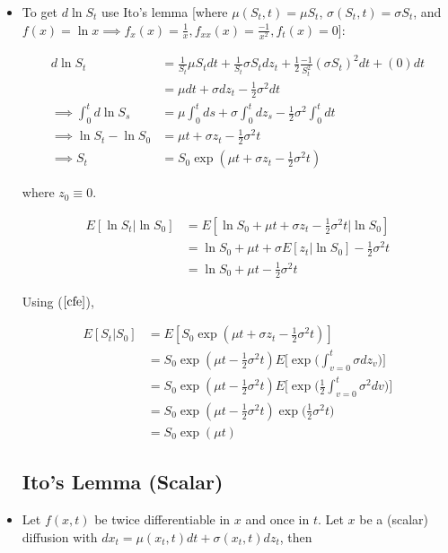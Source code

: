 \documentclass{article}
\begin{document}
\begin{itemize}
\item To get $d \ln S_t$ use Ito's lemma [where $\mu(S_t, t) = \mu S_t$, $\sigma(S_t, t) = \sigma S_t$, and $f(x) = \ln x \implies f_x(x) = \frac{1}{x}, f_{xx}(x) = \frac{-1}{x^2}, f_t(x) = 0$]:

\begin{align*}
d \ln S_t 
&= \frac{1}{S_t} \mu S_t dt  + \frac{1}{S_t} \sigma S_t dz_t + \frac{1}{2} \frac{-1}{S_t^2} (\sigma S_t)^2 dt + (0) dt \\
&= \mu dt + \sigma dz_t - \frac{1}{2} \sigma^2 dt \\
\implies 
\int_0^t d \ln S_s
&= \mu \int_0^t  ds + \sigma \int_0^t dz_s - \frac{1}{2} \sigma^2  \int_0^t dt \\
\implies 
\ln S_t - \ln S_0
&= \mu t + \sigma z_t - \frac{1}{2} \sigma^2 t \\
\implies
S_t &= S_0 \exp (\mu t + \sigma z_t - \frac{1}{2} \sigma^2 t)
\end{align*}

where $z_0 \equiv 0$.

\begin{align*}
E[\ln S_t | \ln S_0 ] 
&= E[\ln S_0 + \mu t + \sigma z_t - \frac{1}{2} \sigma^2 t | \ln S_0 ] \\
&= \ln S_0 + \mu t + \sigma E[z_t|\ln S_0] - \frac{1}{2} \sigma^2 t \\
&=  \ln S_0 + \mu t - \frac{1}{2} \sigma^2 t
\end{align*}

Using ($\ref{cfe}$),

\begin{align*}
E[S_t | S_0] 
&= E[S_0 \exp (\mu t + \sigma z_t - \frac{1}{2} \sigma^2 t)]\\
&= S_0 \exp (\mu t- \frac{1}{2} \sigma^2 t) E\Bigg[\exp\Bigg( \int_{v=0}^t \sigma dz_v\Bigg)\Bigg]\\
&= S_0 \exp (\mu t- \frac{1}{2} \sigma^2 t) E\Bigg[\exp\Bigg(\frac{1}{2} \int_{v=0}^t \sigma^2 dv\Bigg)\Bigg]\\
&= S_0 \exp (\mu t- \frac{1}{2} \sigma^2 t) \exp\Bigg(\frac{1}{2} \sigma^2t \Bigg)\\
&= S_0 \exp (\mu t)
\end{align*}



\subsection*{Ito's Lemma (Scalar)}

\item Let $f(x, t)$ be twice differentiable in $x$ and once in $t$. Let $x$ be a (scalar) diffusion with $dx_t = \mu (x_t, t) dt + \sigma(x_t, t) dz_t$, then


\end{itemize}
\end{document}
